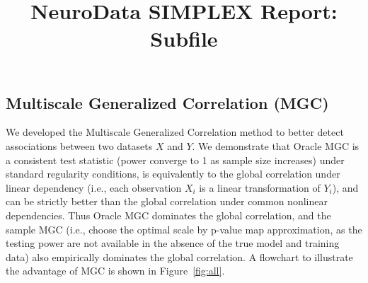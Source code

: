 \documentclass[simplex.tex]{subfiles}
\title{NeuroData SIMPLEX Report: Subfile}
\begin{document}

\subsection{Multiscale Generalized Correlation (MGC)}

We developed the Multiscale Generalized Correlation method to better detect associations between two datasets $X$ and $Y$. We demonstrate that Oracle MGC is a consistent test statistic (power converge to 1 as sample size increases) under standard regularity conditions, is equivalently to the global correlation under linear dependency (i.e., each observation $X_i$ is a linear transformation of $Y_i$), and can be strictly better than the global correlation under common nonlinear dependencies. Thus Oracle MGC dominates the global correlation, and the sample MGC (i.e., choose the optimal scale by p-value map approximation, as the testing power are not available in the absence of the true model and training data) also empirically dominates the global correlation. A flowchart to illustrate the advantage of MGC is shown in Figure~\ref{fig:all}.  
\end{document}
